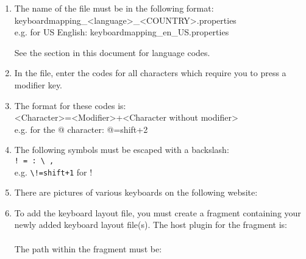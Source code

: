 \begin{enumerate}
\item The name of the file must be in the following format:\\
keyboardmapping\_<language>\_<COUNTRY>.properties\\
e.g. for US English: keyboardmapping\_en\_US.properties

See the section in this document  for language codes.
\item In the file, enter the codes for all characters which require you to press a modifier key. 
\item The format for these codes is:\\
<Character>=<Modifier>+<Character without modifier>\\
e.g. for the @ character: @=shift+2
\item The following symbols must be escaped with a backslash:\\
\verb+! = : \ ,+\\
e.g. \verb?\!=shift+1? for !
\item There are pictures of various keyboards on the following website:\\
\item To add the keyboard layout file, you must create a fragment containing your newly added keyboard layout file(s). The host plugin for the fragment is:\\
\\
The path within the fragment must be:\\
\\


\end{enumerate}


